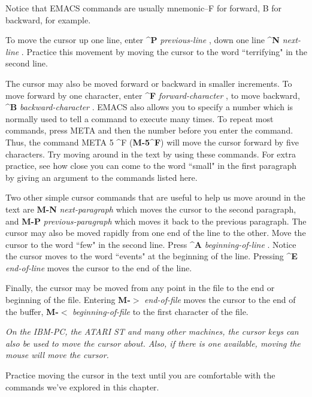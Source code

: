Notice that EMACS commands are usually mnemonic--F for forward, B for
backward, for example.

To move the cursor up one line, enter {\bf{}\^{}P} {\it{}previous-line}
, down one line {\bf{}\^{}N} {\it{}next-line}
.  Practice this movement by moving the cursor to the
word ``terrifying" in the second line.

The cursor may also be moved forward or backward in smaller
increments.  To move forward by one character, enter {\bf{}\^{}F}
{\it{}forward-character} , to move backward,
{\bf{}\^{}B} {\it{}backward-character} .
EMACS also allows you to specify a number which is normally used to
tell a command to execute many times.  To repeat most commands, press
META and then the number before you enter the command.  Thus, the
command META 5 \^{}F ({\bf{}M-5\^{}F}) will move the cursor forward by
five characters.  Try moving around in the text by using these
commands.  For extra practice, see how close you can come to the word
``small" in the first paragraph by giving an argument to the commands
listed here.

Two other simple cursor commands that are useful to help us move
around in the text are {\bf{}M-N} {\it{}next-paragraph}
 which moves the cursor to the second paragraph,
and {\bf{}M-P} {\it{}previous-paragraph} 
which moves it back to the previous paragraph.  The cursor may also be
moved rapidly from one end of the line to the other.  Move the cursor
to the word ``few" in the second line.  Press {\bf{}\^{}A}
{\it{}beginning-of-line} .  Notice the cursor
moves to the word ``events" at the beginning of the line.  Pressing
{\bf{}\^{}E} {\it{}end-of-line}  moves the cursor
to the end of the line.

Finally, the cursor may be moved from any point in the file to the end
or beginning of the file.  Entering {\bf{}M-$>${}} {\it{}end-of-file}
 moves the cursor to the end of the buffer,
{\bf{}M-$<${}} {\it{}beginning-of-file}  to
the first character of the file.

{\it{}On the IBM-PC, the ATARI ST and many other machines, the cursor keys
 can also be used to move the cursor about.  Also, if
there is one available, moving the mouse will move the cursor.}

Practice moving the cursor in the text until you are comfortable with
the commands we've explored in this chapter.

